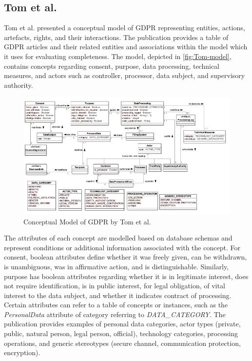 \subsection*{Tom et al.}
Tom et al. \cite{tom_conceptual_2018} presented a conceptual model of GDPR representing entities, actions, artefacts, rights, and their interactions. The publication provides a table of GDPR articles and their related entities and associations within the model which it uses for evaluating completeness.
The model, depicted in \autoref{fig:Tom-model}, contains concepts regarding consent, purpose, data processing, technical measures, and actors such as controller, processor, data subject, and supervisory authority.
\begin{figure}[htbp]
    \centering
    \includegraphics[width=\linewidth]{img/Tom_model.png}
    \caption{Conceptual Model of GDPR by Tom et al. \cite{tom_conceptual_2018}}
    \label{fig:Tom-model}
\end{figure}

The attributes of each concept are modelled based on database schemas and represent conditions or additional information associated with the concept. For consent, boolean attributes define whether it was freely given, can be withdrawn, is unambiguous, was in affirmative action, and is distinguishable. Similarly, purpose has boolean attributes regarding whether it is in legitimate interest, does not require identification, is in public interest, for legal obligation, of vital interest to the data subject, and whether it indicates contract of processing. Certain attributes can refer to a table of concepts or instances, such as the \textit{PersonalData} attribute of category referring to \textit{DATA\_CATEGORY}. The publication provides examples of personal data categories, actor types (private, public, natural person, legal person, official), technology categories, processing operations, and generic stereotypes (secure channel, communication protection, encryption).


